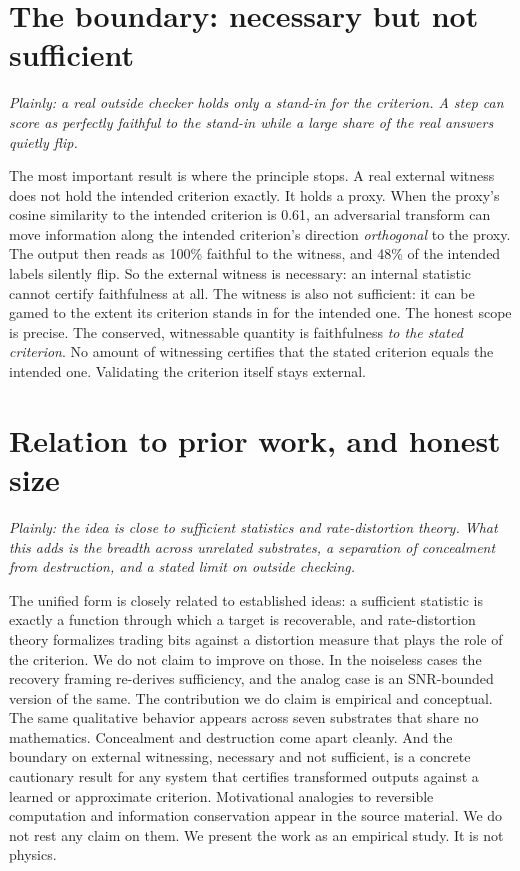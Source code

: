 \documentclass[11pt]{article}
\begin{document}
\section{The boundary: necessary but not sufficient}
\emph{Plainly: a real outside checker holds only a stand-in for the criterion. A step can score as perfectly faithful to the stand-in while a large share of the real answers quietly flip.}

The most important result is where the principle stops. A real external witness does not hold the intended criterion exactly. It holds a proxy. When the proxy's cosine similarity to the intended criterion is 0.61, an adversarial transform can move information along the intended criterion's direction \emph{orthogonal} to the proxy. The output then reads as 100\% faithful to the witness, and 48\% of the intended labels silently flip. So the external witness is necessary: an internal statistic cannot certify faithfulness at all. The witness is also not sufficient: it can be gamed to the extent its criterion stands in for the intended one. The honest scope is precise. The conserved, witnessable quantity is faithfulness \emph{to the stated criterion}. No amount of witnessing certifies that the stated criterion equals the intended one. Validating the criterion itself stays external.

\section{Relation to prior work, and honest size}
\emph{Plainly: the idea is close to sufficient statistics and rate-distortion theory. What this adds is the breadth across unrelated substrates, a separation of concealment from destruction, and a stated limit on outside checking.}

The unified form is closely related to established ideas: a sufficient statistic is exactly a function through which a target is recoverable, and rate-distortion theory formalizes trading bits against a distortion measure that plays the role of the criterion. We do not claim to improve on those. In the noiseless cases the recovery framing re-derives sufficiency, and the analog case is an SNR-bounded version of the same. The contribution we do claim is empirical and conceptual. The same qualitative behavior appears across seven substrates that share no mathematics. Concealment and destruction come apart cleanly. And the boundary on external witnessing, necessary and not sufficient, is a concrete cautionary result for any system that certifies transformed outputs against a learned or approximate criterion. Motivational analogies to reversible computation and information conservation appear in the source material. We do not rest any claim on them. We present the work as an empirical study. It is not physics.
\end{document}
